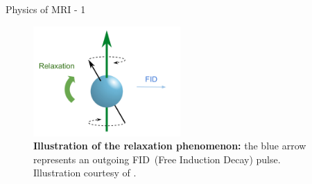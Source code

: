 \documentclass[aspectratio=169,xcolor=dvipsnames]{beamer}
\begin{document}
\begin{frame}{Physics of MRI - 1}
{\begin{figure}
        \centering
        \includegraphics[width=0.5\textwidth]{Figures/intro_figures/Relaxation.pdf}
        \caption{\label{fig:relaxation}\textbf{Illustration of the relaxation phenomenon:} the blue arrow represents an outgoing FID~(Free Induction Decay) pulse. Illustration courtesy of \citet{wiki}.}
    \end{figure}
    }
\end{frame}
\end{document}

